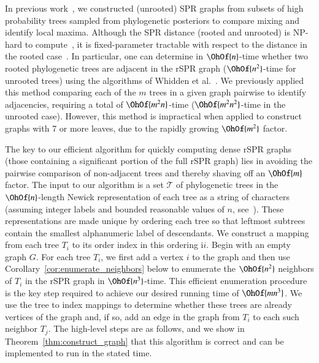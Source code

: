 \documentclass[]{elsarticle}
\begin{document}
In previous work~\citep{Whidden2015-yi}, we constructed (unrooted) SPR graphs from subsets of high probability trees sampled from phylogenetic posteriors to compare mixing and identify local maxima.
Although the SPR distance (rooted and unrooted) is NP-hard to compute~\citep{bordewich05,hickey2008sdc}, it is fixed-parameter tractable with respect to the distance in the rooted case~\citep{bordewich05}.
In particular, one can determine in $\OhOf{n}$-time whether two rooted phylogenetic trees are adjacent in the rSPR graph ($\OhOf{n^2}$-time for unrooted trees) using the algorithms of Whidden et al.~\citep{whidden2009unifying,whidden2010fast, whidden2013hybridization,Whidden2015-yi}.
We previously applied this method comparing each of the $m$ trees in a given graph pairwise to identify adjacencies, requiring a total of $\OhOf{m^2n}$-time ($\OhOf{m^2 n^2}$-time in the unrooted case).
However, this method is impractical when applied to construct graphs with 7 or more leaves, due to the rapidly growing $\OhOf{m^2}$ factor.

The key to our efficient algorithm for quickly computing dense rSPR graphs (those containing a significant portion of the full rSPR graph) lies in avoiding the pairwise comparison of non-adjacent trees and thereby shaving off an $\OhOf{m}$ factor.
The input to our algorithm is a set $\mathcal{T}$ of phylogenetic trees in the $\OhOf{n}$-length Newick \citep{felsenstein1990newick} representation of each tree as a string of characters (assuming integer labels and bounded reasonable values of $n$, see~\citep{whidden2016efficiently}).
These representations are made unique by ordering each tree so that leftmost subtrees contain the smallest alphanumeric label of descendants.
We construct a mapping from each tree $T_i$ to its order index in this ordering i$i$.
Begin with an empty graph $G$.
For each tree $T_i$, we first add a vertex $i$ to the graph and then use Corollary~\ref{cor:enumerate_neighbors} below to enumerate the $\OhOf{n^2}$ neighbors of $T_i$ in the rSPR graph in $\OhOf{n^3}$-time.
This efficient enumeration procedure is the key step required to achieve our desired running time of $\OhOf{mn^3}$.
We use the tree to index mappings to determine whether these trees are already vertices of the graph and, if so, add an edge in the graph from $T_i$ to each such neighbor $T_j$.
The high-level steps are as follows, and we show in Theorem~\ref{thm:construct_graph} that this algorithm is correct and can be implemented to run in the stated time.
\end{document}
